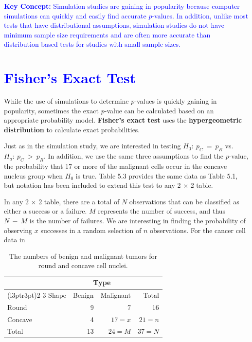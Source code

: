 \documentclass[
]{report}
\begin{document}
\textbf{\textcolor{blue}{Key Concept:}}
\textcolor{blue}{Simulation studies are gaining in popularity because computer simulations can quickly and easily find accurate $\scriptstyle p$-values. In addition, unlike most tests that have distributional assumptions, simulation studies do not have minimum sample size requirements and are often more accurate than distribution-based tests for studies with small sample sizes.}

\hypertarget{section-51}{%
\section{\texorpdfstring{\textcolor{blue}{Fisher’s Exact Test}}{}}\label{section-51}}

While the use of simulations to determine \(\scriptstyle p\)-values is quickly gaining in popularity, sometimes the exact \(\scriptstyle p\)-value can be calculated based on an appropriate probability model. \textbf{Fisher's exact test} uses the \textbf{hypergeometric distribution} to calculate exact probabilities.

Just as in the simulation study, we are interested in testing \(\scriptstyle H_0:\  p_C \ =\  p_R\) vs.~\(\scriptstyle H_a: \ p_C \ >\  p_R\). In addition, we use the same three assumptions to find the \(\scriptstyle p\)-value, the probability that 17 or more of the malignant cells occur in the concave nucleus group when \(\scriptstyle H_0\) is true. Table 5.3 provides the same data as Table 5.1, but notation has been included to extend this test to any 2 × 2 table.

In any 2 × 2 table, there are a total of \(\scriptstyle N\) observations that can be classified as either a success or a failure. \(\scriptstyle M\) represents the number of success, and thus \(\scriptstyle N \ -\  M\) is the number of failures. We are interesting in finding the probability of observing \(\scriptstyle x\) successes in a random selection of \(\scriptstyle n\) observations. For the cancer cell data in

\begin{table}[H]
\centering
\caption{\label{tab:tab53}The numbers of benign and malignant tumors for round and concave cell nuclei.}
\centering
\begin{tabular}[t]{lrrr}
\toprule
\multicolumn{1}{c}{ } & \multicolumn{2}{c}{Type} & \multicolumn{1}{c}{ } \\
\cmidrule(l{3pt}r{3pt}){2-3}
Shape & Benign & Malignant & Total\\
\midrule
Round & 9 & 7 & 16\\
Concave & 4 & $17 = x$ & $21 = n$\\
Total & 13 & $24 = M$ & $37 = N$\\
\bottomrule
\end{tabular}
\end{table}
\end{document}
